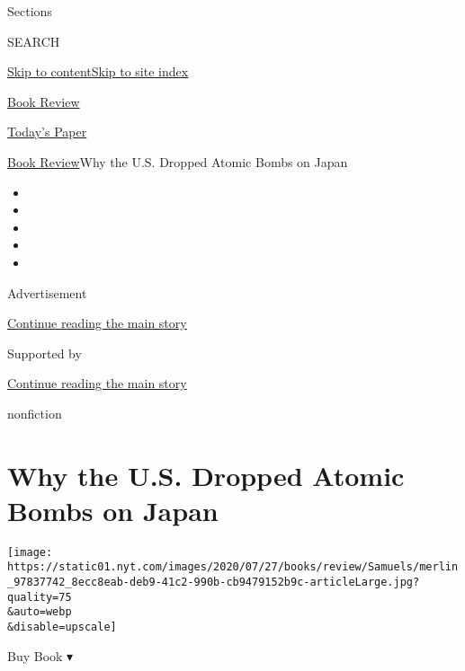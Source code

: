 Sections

SEARCH

\protect\hyperlink{site-content}{Skip to
content}\protect\hyperlink{site-index}{Skip to site index}

\href{https://www.nytimes.com/section/books/review}{Book Review}

\href{https://myaccount.nytimes.com/auth/login?response_type=cookie\&client_id=vi}{}

\href{https://www.nytimes.com/section/todayspaper}{Today's Paper}

\href{/section/books/review}{Book Review}\textbar{}Why the U.S. Dropped
Atomic Bombs on Japan

\begin{itemize}
\item
\item
\item
\item
\item
\end{itemize}

Advertisement

\protect\hyperlink{after-top}{Continue reading the main story}

Supported by

\protect\hyperlink{after-sponsor}{Continue reading the main story}

nonfiction

\hypertarget{why-the-us-dropped-atomic-bombs-on-japan}{%
\section{Why the U.S. Dropped Atomic Bombs on
Japan}\label{why-the-us-dropped-atomic-bombs-on-japan}}

\texttt{[image: https://static01.nyt.com/images/2020/07/27/books/review/Samuels/merlin\_97837742\_8ecc8eab-deb9-41c2-990b-cb9479152b9c-articleLarge.jpg?quality=75\\\&auto=webp\\\&disable=upscale]}

Buy Book ▾

